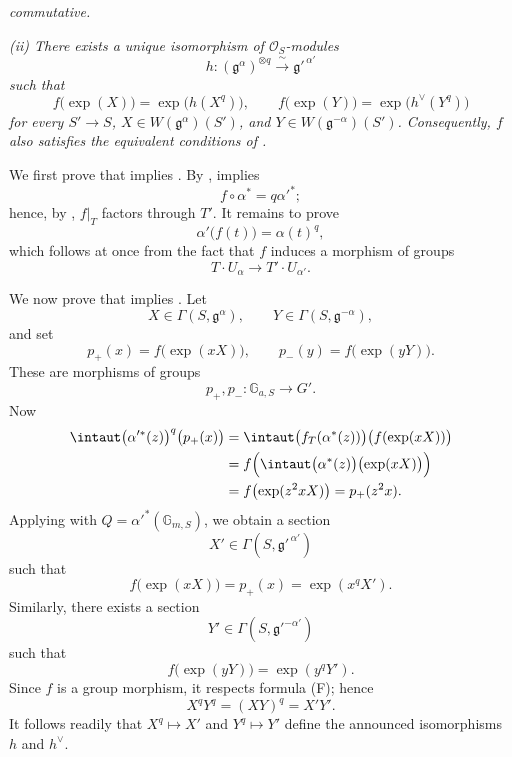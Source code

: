 \noindent\emph{commutative.}

\smallskip
\noindent\emph{\textup{(ii)} There exists a unique isomorphism of
\(\mathcal O_S\)-modules}
\[
  h\colon(\mathfrak g^\alpha)^{\otimes q}
    \xrightarrow{\ \sim\ }\mathfrak g'^{\,\alpha'}
\]
\emph{such that}
\[
  f\bigl(\exp(X)\bigr)=\exp\bigl(h(X^q)\bigr),
  \qquad
  f\bigl(\exp(Y)\bigr)=\exp\bigl(h^\vee(Y^q)\bigr)
\]
\emph{for every \(S'\to S\),
\(X\in W(\mathfrak g^\alpha)(S')\), and
\(Y\in W(\mathfrak g^{-\alpha})(S')\).  Consequently, \(f\) also
satisfies the equivalent conditions of .}

\smallskip
We first prove that \textup{} implies \textup{}.  By ,
\textup{} implies
\[
  f\circ\alpha^\ast=q\alpha'^\ast;
\]
hence, by , \(f|_T\) factors through \(T'\).  It remains to prove
\[
  \alpha'\bigl(f(t)\bigr)=\alpha(t)^q,
\]
which follows at once from the fact that \(f\) induces a morphism of
groups
\[
  T\cdot U_\alpha\longrightarrow T'\cdot U_{\alpha'}.
\]

We now prove that \textup{} implies \textup{}.  Let
\[
  X\in\Gamma(S,\mathfrak g^\alpha),
  \qquad
  Y\in\Gamma(S,\mathfrak g^{-\alpha}),
\]
and set
\[
  p_+(x)=f\bigl(\exp(xX)\bigr),
  \qquad
  p_-(y)=f\bigl(\exp(yY)\bigr).
\]
These are morphisms of groups
\[
  p_+,p_-\colon\mathbb G_{a,S}\longrightarrow G'.
\]
Now
\[
\begin{aligned}
  \intaut\bigl(\alpha'^\ast(z)\bigr)^q\bigl(p_+(x)\bigr)
    &={}\intaut\bigl(f_T(\alpha^\ast(z))\bigr)
       \bigl(f(\exp(xX))\bigr)\\
    &={}f\Bigl(\intaut\bigl(\alpha^\ast(z)\bigr)
       \bigl(\exp(xX)\bigr)\Bigr)\\
    &={}f\bigl(\exp(z^2xX)\bigr)
     =p_+(z^2x).
\end{aligned}
\]
Applying  with
\(Q=\alpha'^\ast(\mathbb G_{m,S})\), we obtain a section
\[
  X'\in\Gamma(S,\mathfrak g'^{\,\alpha'})
\]
such that
\[
  f\bigl(\exp(xX)\bigr)=p_+(x)=\exp(x^qX').
\]
Similarly, there exists a section
\[
  Y'\in\Gamma(S,\mathfrak g'^{-\alpha'})
\]
such that
\[
  f\bigl(\exp(yY)\bigr)=\exp(y^qY').
\]
Since \(f\) is a group morphism, it respects formula \textup{(F)};
hence
\[
  X^qY^q=(XY)^q=X'Y'.
\]
It follows readily that \(X^q\mapsto X'\) and \(Y^q\mapsto Y'\)
define the announced isomorphisms \(h\) and \(h^\vee\).
